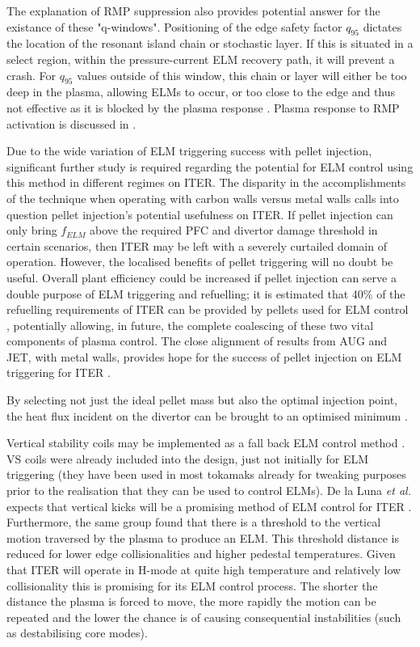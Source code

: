 \documentclass[11pt, twocolumn]{article}  %
\newcommand{\citep}[1]{\cite{#1}}
\begin{document}
The explanation \cite{Snyder2012} of RMP suppression also provides potential answer for the existance of these "q-windows". Positioning of the edge safety factor $q_{95}$ dictates the location of the resonant island chain or stochastic layer. If this is situated in a select region, within the pressure-current ELM recovery path, it will prevent a crash. For $q_{95}$ values outside of this window, this chain or layer will either be too deep in the plasma, allowing ELMs to occur, or too close to the edge and thus not effective as it is blocked by the plasma response \cite{Snyder2012}. Plasma response to RMP activation is discussed in \cite{Waelbroeck2009}.

Due to the wide variation of ELM triggering success with pellet injection, significant further study is required regarding the potential for ELM control using this method in different regimes on ITER. The disparity in the accomplishments of the technique when operating with carbon walls versus metal walls calls into question pellet injection's potential usefulness on ITER. If pellet injection can only bring $f_{ELM}$ above the required PFC and divertor damage threshold in certain scenarios, then ITER may be left with a severely curtailed domain of operation. However, the localised benefits of pellet triggering will no doubt be useful. Overall plant efficiency could be increased if pellet injection can serve a double purpose of ELM triggering and refuelling; it is estimated that 40\% of the refuelling requirements of ITER can be provided by pellets used for ELM control \cite{Loarte2014a}, potentially allowing, in future, the complete coalescing of these two vital components of plasma control. The close alignment of results from AUG and JET, with metal walls, provides hope for the success of pellet injection on ELM triggering for ITER \cite{Lang2015}.

By selecting not just the ideal pellet mass but also the optimal injection point, the heat flux incident on the divertor can be brought to an optimised minimum \citep{Baylor2015}.

Vertical stability coils may be implemented as a fall back ELM control method \cite{Loarte2014a}. VS coils were already included into the design, just not initially for ELM triggering (they have been used in most tokamaks already for tweaking purposes prior to the realisation that they can be used to control ELMs). De la Luna \textit{et al.} expects that vertical kicks will be a promising method of ELM control for ITER \cite{DelaLuna2016}. Furthermore, the same group found that there is a threshold to the vertical motion traversed by the plasma to produce an ELM. This threshold distance is reduced for lower edge collisionalities and higher pedestal temperatures. Given that ITER will operate in H-mode at quite high temperature and relatively low collisionality this is promising for its ELM control process. The shorter the distance the plasma is forced to move, the more rapidly the motion can be repeated and the lower the chance is of causing consequential instabilities (such as destabilising core modes).
\end{document}
